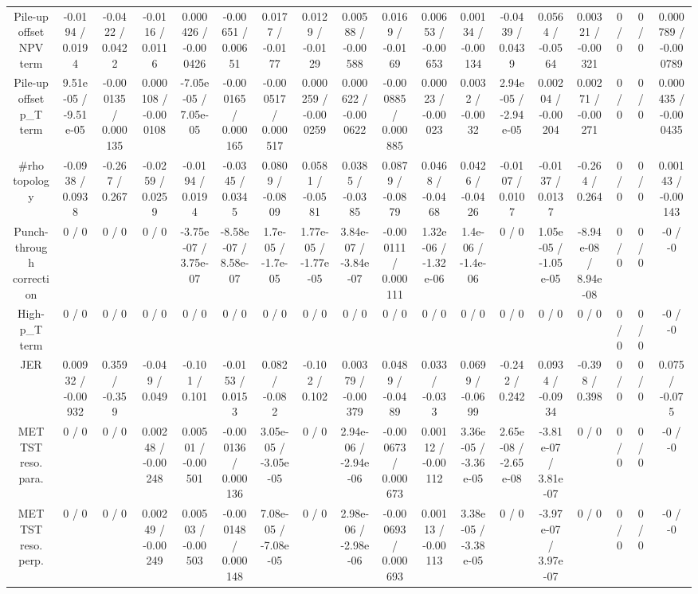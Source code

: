 \documentclass[10pt]{article}
\begin{document}
\begin{table}[htbp]
\begin{center}
\begin{tabular}{|c|c|c|c|c|c|c|c|c|c|c|c|c|c|c|c|c|c|}
  Pile-up offset NPV term & -0.0194 / 0.0194 & -0.0422 / 0.0422 & -0.0116 / 0.0116 & 0.000426 / -0.000426 & -0.00651 / 0.00651 & 0.0177 / -0.0177 & 0.0129 / -0.0129 & 0.00588 / -0.00588 & 0.0169 / -0.0169 & 0.00653 / -0.00653 & 0.00134 / -0.00134 & -0.0439 / 0.0439 & 0.0564 / -0.0564 & 0.00321 / -0.00321 & 0 / 0 & 0 / 0 & 0.000789 / -0.000789 \\ 
  Pile-up offset p_{T} term & 9.51e-05 / -9.51e-05 & -0.000135 / 0.000135 & 0.000108 / -0.000108 & -7.05e-05 / 7.05e-05 & -0.000165 / 0.000165 & -0.000517 / 0.000517 & 0.000259 / -0.000259 & 0.000622 / -0.000622 & -0.000885 / 0.000885 & 0.00023 / -0.00023 & 0.0032 / -0.0032 & 2.94e-05 / -2.94e-05 & 0.00204 / -0.00204 & 0.00271 / -0.00271 & 0 / 0 & 0 / 0 & 0.000435 / -0.000435 \\ 
  #rho topology & -0.0938 / 0.0938 & -0.267 / 0.267 & -0.0259 / 0.0259 & -0.0194 / 0.0194 & -0.0345 / 0.0345 & 0.0809 / -0.0809 & 0.0581 / -0.0581 & 0.0385 / -0.0385 & 0.0879 / -0.0879 & 0.0468 / -0.0468 & 0.0426 / -0.0426 & -0.0107 / 0.0107 & -0.0137 / 0.0137 & -0.264 / 0.264 & 0 / 0 & 0 / 0 & 0.00143 / -0.00143 \\ 
  Punch-through correction & 0 / 0 & 0 / 0 & 0 / 0 & -3.75e-07 / 3.75e-07 & -8.58e-07 / 8.58e-07 & 1.7e-05 / -1.7e-05 & 1.77e-05 / -1.77e-05 & 3.84e-07 / -3.84e-07 & -0.000111 / 0.000111 & 1.32e-06 / -1.32e-06 & 1.4e-06 / -1.4e-06 & 0 / 0 & 1.05e-05 / -1.05e-05 & -8.94e-08 / 8.94e-08 & 0 / 0 & 0 / 0 & -0 / -0 \\ 
  High-p_{T} term & 0 / 0 & 0 / 0 & 0 / 0 & 0 / 0 & 0 / 0 & 0 / 0 & 0 / 0 & 0 / 0 & 0 / 0 & 0 / 0 & 0 / 0 & 0 / 0 & 0 / 0 & 0 / 0 & 0 / 0 & 0 / 0 & -0 / -0 \\ 
  JER & 0.00932 / -0.00932 & 0.359 / -0.359 & -0.049 / 0.049 & -0.101 / 0.101 & -0.0153 / 0.0153 & 0.082 / -0.082 & -0.102 / 0.102 & 0.00379 / -0.00379 & 0.0489 / -0.0489 & 0.033 / -0.033 & 0.0699 / -0.0699 & -0.242 / 0.242 & 0.0934 / -0.0934 & -0.398 / 0.398 & 0 / 0 & 0 / 0 & 0.075 / -0.075 \\ 
  MET TST reso. para. & 0 / 0 & 0 / 0 & 0.00248 / -0.00248 & 0.00501 / -0.00501 & -0.000136 / 0.000136 & 3.05e-05 / -3.05e-05 & 0 / 0 & 2.94e-06 / -2.94e-06 & -0.000673 / 0.000673 & 0.00112 / -0.00112 & 3.36e-05 / -3.36e-05 & 2.65e-08 / -2.65e-08 & -3.81e-07 / 3.81e-07 & 0 / 0 & 0 / 0 & 0 / 0 & -0 / -0 \\ 
  MET TST reso. perp. & 0 / 0 & 0 / 0 & 0.00249 / -0.00249 & 0.00503 / -0.00503 & -0.000148 / 0.000148 & 7.08e-05 / -7.08e-05 & 0 / 0 & 2.98e-06 / -2.98e-06 & -0.000693 / 0.000693 & 0.00113 / -0.00113 & 3.38e-05 / -3.38e-05 & 0 / 0 & -3.97e-07 / 3.97e-07 & 0 / 0 & 0 / 0 & 0 / 0 & -0 / -0 \\ 

\end{tabular}
\end{center}
\end{table}
\end{document}

